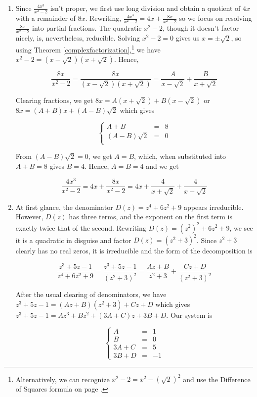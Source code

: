 \documentclass{ximera}
\begin{document}
\begin{example}
\begin{enumerate}
\item  Since  $\frac{4x^3}{x^2-2}$ isn't proper, we first use long division and obtain a quotient of $4x$ with a remainder of $8x$.  Rewriting,  $\frac{4x^3}{x^2-2} = 4x + \frac{8x}{x^2-2}$ so we focus on resolving $\frac{8x}{x^2-2}$ into partial fractions.  The quadratic $x^2-2$, though it doesn't factor nicely, is, nevertheless, reducible. Solving $x^2-2 =0$ gives us $x = \pm \sqrt{2}$, so using Theorem \ref{complexfactorization},\footnote{Alternatively, we can recognize $x^2-2 = x^2-(\sqrt{2})^2$ and use the Difference of Squares formula on page \pageref{CommonFactoringFormulas}.} we have $x^2-2 = \left(x - \sqrt{2}\right)\left(x + \sqrt{2}\right)$. Hence,

\[ \frac{8x}{x^2-2} = \frac{8x}{ \left(x - \sqrt{2}\right)\left(x + \sqrt{2}\right)} = \frac{A}{x - \sqrt{2}} + \frac{B}{x + \sqrt{2}} \]

Clearing fractions, we get $8x = A\left(x + \sqrt{2}\right) + B\left(x - \sqrt{2}\right)$ or $8x = (A+B)x + (A-B)\sqrt{2}$ which gives


\[ \left\{ \begin{array}{rcr}  A+B & = & 8 \\ (A-B)\sqrt{2} & = & 0 \\ \end{array} \right.\]

From $(A-B)\sqrt{2}=0$, we get $A=B$, which, when substituted into $A+B = 8$ gives $B = 4$.  Hence, $A = B = 4$ and we get

\[\frac{4x^3}{x^2-2} = 4x + \frac{8x}{x^2-2} = 4x + \frac{4}{x + \sqrt{2}} + \frac{4}{x - \sqrt{2}}\]

\item  At first glance, the denominator $D(z) = z^4+6z^2+9$ appears irreducible. However, $D(z)$ has three terms, and the exponent on the first term is exactly twice that of the second.  Rewriting $D(z) = \left(z^2\right)^2 + 6z^2 + 9$, we see it is a quadratic in disguise and factor $D(z) = \left(z^2+3\right)^2$.  Since $z^2+3$ clearly has no real zeros, it is irreducible and the form of the decomposition is

\[ \frac{z^3+5z-1}{z^4+6z^2+9} =  \frac{z^3+5z-1}{\left(z^2+3\right)^2} = \frac{Az+B}{z^2+3} + \frac{Cz+D}{\left(z^2+3\right)^2}\]

After the usual clearing of denominators, we have $z^3 + 5z-1 = (Az+B)\left(z^2+3\right) + Cz + D$ which gives $z^3+5z-1 = Az^3 + Bz^2 + (3A+C)z + 3B+D$.  Our system is 

\[ \left\{ \begin{array}{rcr} A & = & 1 \\ B & = & 0 \\ 3A + C & = & 5 \\ 3B+D & = & -1 \end{array} \right.\]


\end{enumerate}
\end{example}
\end{document}
